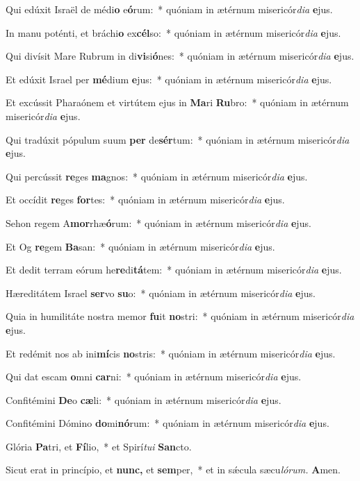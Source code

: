 \item Qui edúxit Israël de médi\textbf{o} e\textbf{ó}rum:~* quóniam in ætérnum misericór\textit{dia} \textbf{e}jus.
\item In manu poténti, et bráchi\textbf{o} ex\textbf{cél}so:~* quóniam in ætérnum misericór\textit{dia} \textbf{e}jus.
\item Qui divísit Mare Rubrum in di\textbf{vi}si\textbf{ó}nes:~* quóniam in ætérnum misericór\textit{dia} \textbf{e}jus.
\item Et edúxit Israel per \textbf{mé}dium \textbf{e}jus:~* quóniam in ætérnum misericór\textit{dia} \textbf{e}jus.
\item Et excússit Pharaónem et virtútem ejus in \textbf{Ma}ri \textbf{Ru}bro:~* quóniam in ætérnum misericór\textit{dia} \textbf{e}jus.
\item Qui tradúxit pópulum suum \textbf{per} de\textbf{sér}tum:~* quóniam in ætérnum misericór\textit{dia} \textbf{e}jus.
\item Qui percússit \textbf{re}ges \textbf{ma}gnos:~* quóniam in ætérnum misericór\textit{dia} \textbf{e}jus.
\item Et occídit \textbf{re}ges \textbf{for}tes:~* quóniam in ætérnum misericór\textit{dia} \textbf{e}jus.
\item Sehon regem A\textbf{mor}rhæ\textbf{ó}rum:~* quóniam in ætérnum misericór\textit{dia} \textbf{e}jus.
\item Et Og \textbf{re}gem \textbf{Ba}san:~* quóniam in ætérnum misericór\textit{dia} \textbf{e}jus.
\item Et dedit terram eórum he\textbf{re}di\textbf{tá}tem:~* quóniam in ætérnum misericór\textit{dia} \textbf{e}jus.
\item Hæreditátem Israel \textbf{ser}vo \textbf{su}o:~* quóniam in ætérnum misericór\textit{dia} \textbf{e}jus.
\item Quia in humilitáte nostra memor \textbf{fu}it \textbf{no}stri:~* quóniam in ætérnum misericór\textit{dia} \textbf{e}jus.
\item Et redémit nos ab ini\textbf{mí}cis \textbf{no}stris:~* quóniam in ætérnum misericór\textit{dia} \textbf{e}jus.
\item Qui dat escam \textbf{o}mni \textbf{car}ni:~* quóniam in ætérnum misericór\textit{dia} \textbf{e}jus.
\item Confitémini \textbf{De}o \textbf{cæ}li:~* quóniam in ætérnum misericór\textit{dia} \textbf{e}jus.
\item Confitémini Dómino \textbf{do}mi\textbf{nó}rum:~* quóniam in ætérnum misericór\textit{dia} \textbf{e}jus.
\item Glória \textbf{Pa}tri, et \textbf{Fí}lio,~* et Spirí\tinyhspace\textit{tui} \textbf{San}cto.
\item Sicut erat in princípio, et \textbf{nunc,} et \textbf{sem}per,~* et in sǽcula sæcu\tinyhspace\textit{lórum.} \textbf{A}men.